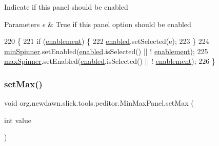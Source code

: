 Indicate if this panel should be enabled


\begin{DoxyParams}{Parameters}
{\em e} & True if this panel option should be enabled \\
\hline
\end{DoxyParams}

\begin{DoxyCode}
220                                            \{
221         \textcolor{keywordflow}{if} (\mbox{\hyperlink{classorg_1_1newdawn_1_1slick_1_1tools_1_1peditor_1_1_min_max_panel_a82cdf912c2f081581d288b771c431703}{enablement}}) \{
222             \mbox{\hyperlink{classorg_1_1newdawn_1_1slick_1_1tools_1_1peditor_1_1_min_max_panel_aff685339c4d9c4cf8009bcfbf2bc72de}{enabled}}.setSelected(e);
223         \}
224         \mbox{\hyperlink{classorg_1_1newdawn_1_1slick_1_1tools_1_1peditor_1_1_min_max_panel_ae09b9ecc2a254d7a74044bb20b6b62e6}{minSpinner}}.setEnabled(\mbox{\hyperlink{classorg_1_1newdawn_1_1slick_1_1tools_1_1peditor_1_1_min_max_panel_aff685339c4d9c4cf8009bcfbf2bc72de}{enabled}}.isSelected() || !
      \mbox{\hyperlink{classorg_1_1newdawn_1_1slick_1_1tools_1_1peditor_1_1_min_max_panel_a82cdf912c2f081581d288b771c431703}{enablement}});
225         \mbox{\hyperlink{classorg_1_1newdawn_1_1slick_1_1tools_1_1peditor_1_1_min_max_panel_a9e445c1f2ecd3c64e93ec8bf69f639f9}{maxSpinner}}.setEnabled(\mbox{\hyperlink{classorg_1_1newdawn_1_1slick_1_1tools_1_1peditor_1_1_min_max_panel_aff685339c4d9c4cf8009bcfbf2bc72de}{enabled}}.isSelected() || !
      \mbox{\hyperlink{classorg_1_1newdawn_1_1slick_1_1tools_1_1peditor_1_1_min_max_panel_a82cdf912c2f081581d288b771c431703}{enablement}});
226     \}
\end{DoxyCode}
\mbox{\label{classorg_1_1newdawn_1_1slick_1_1tools_1_1peditor_1_1_min_max_panel_a3beee34aaf43d6a97e842d563edc0ce0}} 
\subsubsection{\texorpdfstring{set\+Max()}{setMax()}}
{\footnotesize\ttfamily void org.\+newdawn.\+slick.\+tools.\+peditor.\+Min\+Max\+Panel.\+set\+Max (\begin{DoxyParamCaption}\item[{int}]{value }\end{DoxyParamCaption})\hspace{0.3cm}{\ttfamily [inline]}}

